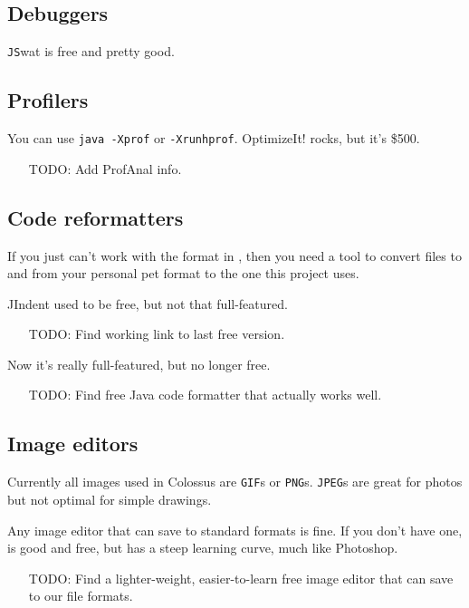 \documentclass{article}
\begin{document}
\subsection{Debuggers}

\texttt{JS}wat is free and pretty good.

\subsection{Profilers}

You can use \texttt{java -Xprof} or \texttt{-Xrunhprof}.
OptimizeIt! rocks, but it's \$500.
\begin{itemize}
\item[TODO:] Add ProfAnal info.
\end{itemize}

\subsection{Code reformatters}

If you just can't work with the format in
,
then you need a tool to convert files to and from your personal pet
format to the one this project uses.

JIndent used to be free, but not that full-featured. 
\begin{itemize}
\item[TODO:] Find working link to last free version.
\end{itemize}
Now it's really full-featured, but no longer free.
\begin{itemize}
\item[TODO:] Find free Java code formatter that actually works well.
\end{itemize}

\subsection{Image editors}

Currently all images used in Colossus are \texttt{GIF}s or \texttt{PNG}s.
\texttt{JPEG}s are great for photos but not optimal for simple drawings.

Any image editor that can save to standard formats is fine. If you
don't have one,  is good and free,
but has a steep learning curve, much like Photoshop. 
\begin{itemize}
\item[TODO:] Find a lighter-weight, easier-to-learn free image editor that 
can save to our file formats.
\end{itemize}
\end{document}
